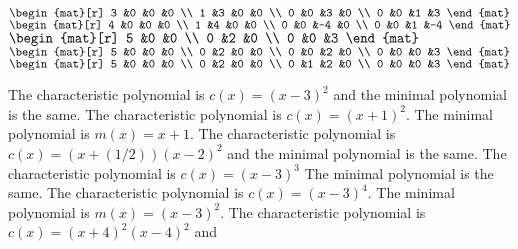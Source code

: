 \begin{exercises}
\begin{exparts*}
      \partsitem 
        $\begin{mat}[r]
           3  &0  &0  &0  \\
           1  &3  &0  &0  \\
           0  &0  &3  &0  \\
           0  &0  &1  &3 
         \end{mat}$
      \partsitem 
        $\begin{mat}[r]
           4  &0  &0  &0  \\
           1  &4  &0  &0  \\
           0  &0  &-4 &0  \\
           0  &0  &1  &-4
         \end{mat}$
      \partsitem 
        $\begin{mat}[r]
           5  &0  &0  \\
           0  &2  &0  \\
           0  &0  &3  
         \end{mat}$
      \partsitem 
        $\begin{mat}[r]
           5  &0  &0  &0  \\
           0  &2  &0  &0  \\
           0  &0  &2  &0  \\
           0  &0  &0  &3 
         \end{mat}$
      \partsitem 
        $\begin{mat}[r]
           5  &0  &0  &0  \\
           0  &2  &0  &0  \\
           0  &1  &2  &0  \\
           0  &0  &0  &3 
         \end{mat}$
    \end{exparts*}
    \begin{answer}
      \begin{exparts}
        \partsitem The characteristic polynomial is $c(x)=(x-3)^2$ and
          the minimal polynomial is the same.
        \partsitem The characteristic polynomial is $c(x)=(x+1)^2$.
          The minimal polynomial is $m(x)=x+1$.
        \partsitem The characteristic polynomial is 
          $c(x)=(x+(1/2))(x-2)^2$ and
          the minimal polynomial is the same.
        \partsitem The characteristic polynomial is $c(x)=(x-3)^3$
          The minimal polynomial is the same.
        \partsitem The characteristic polynomial is $c(x)=(x-3)^4$.
          The minimal polynomial is $m(x)=(x-3)^2$.
        \partsitem The characteristic polynomial is $c(x)=(x+4)^2(x-4)^2$ and

\end{exparts}
\end{answer}
\end{exercises}
